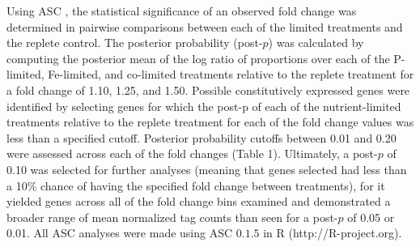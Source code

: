 Using ASC \citep{Wu2010}, the statistical significance of an observed fold change was determined in pairwise comparisons between each of the limited treatments and the replete control. The posterior probability (post-$p$) was calculated by computing the posterior mean of the log ratio of proportions over each of the P-limited, Fe-limited, and co-limited treatments relative to the replete treatment for a fold change of 1.10, 1.25, and 1.50. Possible constitutively expressed genes were identified by selecting genes for which the post-p of each of the nutrient-limited treatments relative to the replete treatment for each of the fold change values was less than a specified cutoff. Posterior probability cutoffs between 0.01 and 0.20 were assessed across each of the fold changes (Table 1). Ultimately, a post-$p$ of 0.10 was selected for further analyses (meaning that genes selected had less than a 10\% chance of having the specified fold change between treatments), for it yielded genes across all of the fold change bins examined and demonstrated a broader range of mean normalized tag counts than seen for a post-$p$ of 0.05 or 0.01. All ASC analyses were made using ASC $0.1.5$ in R (http://R-project.org). \par

